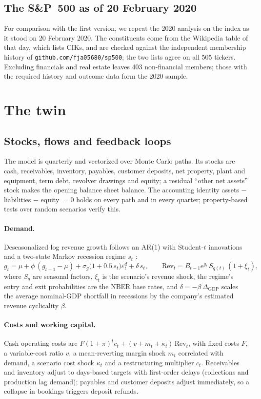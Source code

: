 \subsection{The S\&P~500 as of 20 February 2020}
For comparison with the first version, we repeat the 2020 analysis on the index as it stood on 20 February 2020. The constituents come from the Wikipedia table of that day, which lists CIKs, and are checked against the independent membership history of \texttt{github.com/fja05680/sp500}; the two lists agree on all 505 tickers. Excluding financials and real estate leaves 403 non-financial members; those with the required history and outcome data form the 2020 sample.

\section{The twin}\label{sec:model}

\subsection{Stocks, flows and feedback loops}
The model is quarterly and vectorized over Monte Carlo paths. Its stocks are cash, receivables, inventory, payables, customer deposits, net property, plant and equipment, term debt, revolver drawings and equity; a residual ``other net assets'' stock makes the opening balance sheet balance. The accounting identity assets $-$ liabilities $-$ equity $=0$ holds on every path and in every quarter; property-based tests over random scenarios verify this.

\paragraph{Demand.} Deseasonalized log revenue growth follows an AR(1) with Student-$t$ innovations and a two-state Markov recession regime $s_t$ \citep{hamilton1989}:
\begin{equation}
g_t=\mu+\phi\,(g_{t-1}-\mu)+\sigma_g\bigl(1+0.5\,s_t\bigr)\varepsilon^{d}_t+\delta\,s_t,\qquad
\mathrm{Rev}_t=B_{t-1}e^{g_t}\,S_{q(t)}\,(1+\xi_t),
\end{equation}
where $S_{q}$ are seasonal factors, $\xi_t$ is the scenario's revenue shock, the regime's entry and exit probabilities are the NBER base rates, and $\delta=-\beta\,\Delta_{\mathrm{GDP}}$ scales the average nominal-GDP shortfall in recessions by the company's estimated revenue cyclicality $\beta$.

\paragraph{Costs and working capital.} Cash operating costs are $F(1+\pi)^t c_t+(v+m_t+\kappa_t)\,\mathrm{Rev}_t$, with fixed costs $F$, a variable-cost ratio $v$, a mean-reverting margin shock $m_t$ correlated with demand, a scenario cost shock $\kappa_t$ and a restructuring multiplier $c_t$. Receivables and inventory adjust to days-based targets with first-order delays (collections and production lag demand); payables and customer deposits adjust immediately, so a collapse in bookings triggers deposit refunds.

